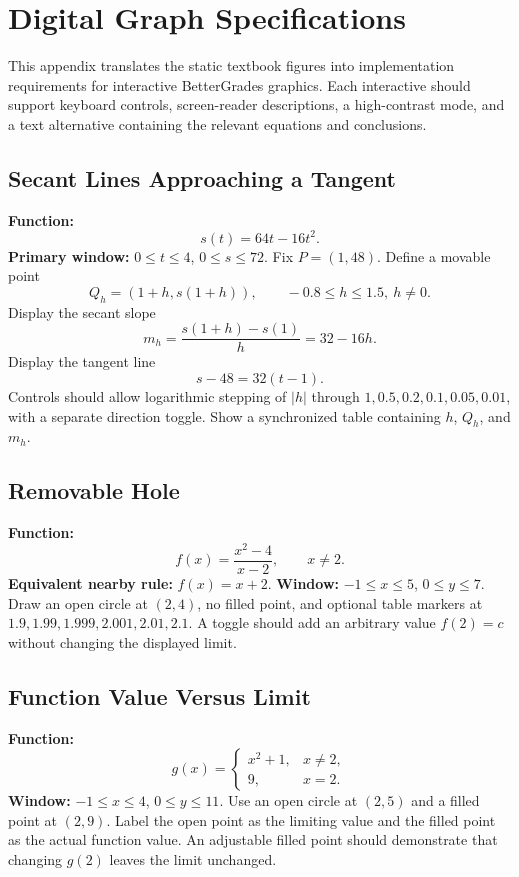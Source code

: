 \chapter{Digital Graph Specifications}

This appendix translates the static textbook figures into implementation requirements for interactive BetterGrades graphics. Each interactive should support keyboard controls, screen-reader descriptions, a high-contrast mode, and a text alternative containing the relevant equations and conclusions.

\section{Secant Lines Approaching a Tangent}

\begin{bggraphspec}
\textbf{Function:}
\[
  s(t)=64t-16t^2.
\]
\textbf{Primary window:} \(0\le t\le4\), \(0\le s\le72\). Fix \(P=(1,48)\). Define a movable point
\[
  Q_h=(1+h,s(1+h)),\qquad -0.8\le h\le1.5,\ h\ne0.
\]
Display the secant slope
\[
  m_h=\frac{s(1+h)-s(1)}h=32-16h.
\]
Display the tangent line
\[
  s-48=32(t-1).
\]
Controls should allow logarithmic stepping of \(|h|\) through \(1,0.5,0.2,0.1,0.05,0.01\), with a separate direction toggle. Show a synchronized table containing \(h\), \(Q_h\), and \(m_h\).
\end{bggraphspec}

\section{Removable Hole}

\begin{bggraphspec}
\textbf{Function:}
\[
  f(x)=\frac{x^2-4}{x-2},\qquad x\ne2.
\]
\textbf{Equivalent nearby rule:} \(f(x)=x+2\). \textbf{Window:} \(-1\le x\le5\), \(0\le y\le7\). Draw an open circle at \((2,4)\), no filled point, and optional table markers at \(1.9,1.99,1.999,2.001,2.01,2.1\). A toggle should add an arbitrary value \(f(2)=c\) without changing the displayed limit.
\end{bggraphspec}

\section{Function Value Versus Limit}

\begin{bggraphspec}
\textbf{Function:}
\[
  g(x)=\begin{cases}x^2+1,&x\ne2,\\9,&x=2.\end{cases}
\]
\textbf{Window:} \(-1\le x\le4\), \(0\le y\le11\). Use an open circle at \((2,5)\) and a filled point at \((2,9)\). Label the open point as the limiting value and the filled point as the actual function value. An adjustable filled point should demonstrate that changing \(g(2)\) leaves the limit unchanged.
\end{bggraphspec}

